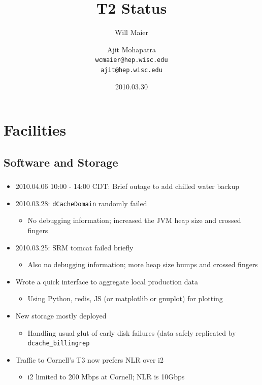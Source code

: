 \documentclass{beamer}
\title{T2 Status}
\author[Maier, Mohapatra]{
    Will Maier \and Ajit Mohapatra\\
    {\tt wcmaier@hep.wisc.edu}\\
    {\tt ajit@hep.wisc.edu}}
\institute[Wisconsin]{University of Wisconsin - High Energy Physics}
\date{2010.03.30}
\begin{document}
\begin{frame}
    \titlepage
\end{frame}


\section{Facilities}
\subsection{Software and Storage}
\begin{frame}
\frametitle{}

\begin{itemize}
	\item 2010.04.06 10:00 - 14:00 CDT: Brief outage to add chilled water backup
	\item 2010.03.28: {\tt dCacheDomain} randomly failed
	\begin{itemize}
		\item No debugging information; increased the JVM heap size and crossed fingers
	\end{itemize}
	\item 2010.03.25: SRM tomcat failed briefly
	\begin{itemize}
		\item Also no debugging information; more heap size bumps and crossed fingers
	\end{itemize}
	\item Wrote a quick interface to aggregate local production data
	\begin{itemize}
		\item Using Python, redis, JS (or matplotlib or gnuplot) for plotting
	\end{itemize}
	\item New storage mostly deployed
	\begin{itemize}
		\item Handling usual glut of early disk failures (data safely replicated by {\tt dcache\_billingrep}
	\end{itemize}
	\item Traffic to Cornell's T3 now prefers NLR over i2
	\begin{itemize}
		\item i2 limited to 200 Mbps at Cornell; NLR is 10Gbps
	\end{itemize}
\end{itemize}
\end{frame}
\end{document}
